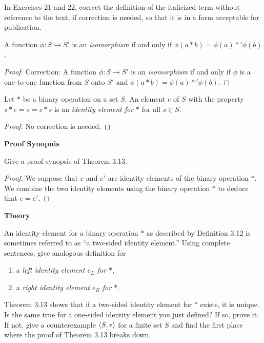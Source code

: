 In Exercises 21 and 22, correct the definition of the italicized term without reference to the text, if correction is needed, so that it is in a form acceptable for publication.

\begin{exercise}
    A function $\phi: S\to S'$ is an \textit{isomorphism} if and only if $\phi(a * b) = \phi(a) *' \phi(b)$.
\end{exercise}

\begin{proof}
    Correction: A function $\phi: S\to S'$ is an \textit{isomorphism} if and only if $\phi$ is a one-to-one function from $S$ onto $S'$ and $\phi(a * b) = \phi(a) *' \phi(b)$.
\end{proof}

\begin{exercise}
    Let $*$ be a binary operation on a set $S$. An element $e$ of $S$ with the property $s * e = s = e * s$ is an \textit{identity element for $*$}  for all $s\in S$.
\end{exercise}

\begin{proof}
    No correction is needed.
\end{proof}

\textbf{Proof Synopnis}

\begin{exercise}
    Give a proof synopsis of Theorem 3.13.
\end{exercise}

\begin{proof}
    We suppose that $e$ and $e'$ are identity elements of the binary operation $*$. We combine the two identity elements using the binary operation $*$ to deduce that $e = e'$.
\end{proof}

\textbf{Theory}

\begin{exercise}
    An identity element for a binary operation $*$ as described by Definition 3.12 is sometimes referred to as ``a two-sided identity element.\@'' Using complete sentences, give analogous definition for
    \begin{enumerate}[label={\textbf{\alph*.}},itemsep=0pt]
        \item a \textit{left identity element $e_{L}$ for $*$},
        \item a \textit{right identity element $e_{R}$ for $*$}.
    \end{enumerate}

    Theorem 3.13 shows that if a two-sided identity element for $*$ exists, it is unique. Is the same true for a one-sided identity element you just defined? If so, prove it. If not, give a counterexample $\left\langle{S,*}\right\rangle$ for a finite set $S$ and find the first place where the proof of Theorem 3.13 breaks down.
\end{exercise}

